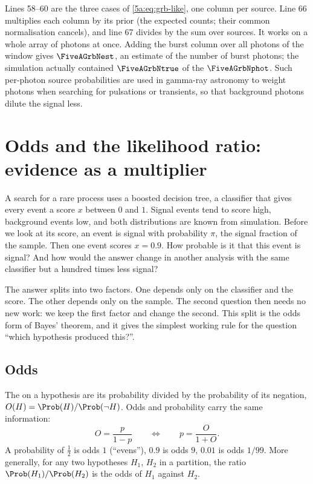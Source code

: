 
Lines 58--60 are the three cases of \eqref{5a:eq:grb-like}, one column per source.
Line 66 multiplies each column by its prior (the expected counts; their common
normalisation cancels), and line 67 divides by the sum over sources. It works on a
whole array of photons at once. Adding the burst column over all photons of the
window gives $\FiveAGrbNest$, an estimate of the number of burst photons; the
simulation actually contained $\FiveAGrbNtrue$ of the $\FiveAGrbNphot$. Such
per-photon source probabilities are used in gamma-ray astronomy to weight photons
when searching for pulsations or transients, so that background photons dilute the
signal less.
\section{Odds and the likelihood ratio: evidence as a multiplier}
\label{5a:sec:odds}

A search for a rare process uses a boosted decision tree, a classifier that gives
every event a score $x$ between $0$ and $1$. Signal events tend to score high,
background events low, and both distributions are known from simulation. Before we
look at its score, an event is signal with probability $\pi$, the signal fraction of
the sample. Then one event scores $x=0.9$. How probable is it that this event is
signal? And how would the answer change in another analysis with the same classifier
but a hundred times less signal?

The answer splits into two factors. One depends only on the classifier and the
score. The other depends only on the sample. The second question then needs no new
work: we keep the first factor and change the second. This split is the odds form
of Bayes' theorem, and it gives the simplest working rule for the question
``which hypothesis produced this?''.

\subsection{Odds}

The  on a hypothesis are its probability divided by the probability of
its negation, $O(H)=\Prob(H)/\Prob(\neg H)$. Odds and probability carry the same
information:
\begin{equation}
  O=\frac{p}{1-p}
  \qquad\Longleftrightarrow\qquad
  p=\frac{O}{1+O} .
  \label{5a:eq:odds-prob}
\end{equation}
A probability of $\frac12$ is odds $1$ (``evens''), $0.9$ is odds $9$, $0.01$ is odds
$1/99$. More generally, for any two hypotheses $H_1$, $H_2$ in a partition, the ratio
$\Prob(H_1)/\Prob(H_2)$ is the odds of $H_1$ against $H_2$.

